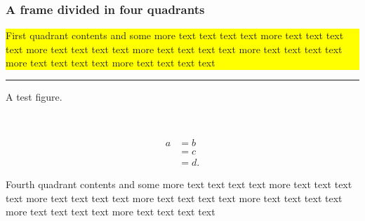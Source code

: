\documentclass[t]{beamer}
\newcommand\FourQuad[4]{
    \colorbox{yellow}{\begin{minipage}[b][.40\textheight][t]{.49\textwidth}#1\end{minipage}}\hfill
    \begin{minipage}[b][.40\textheight][t]{.49\textwidth}#2\end{minipage}\\
    \begin{minipage}[b][.40\textheight][t]{.49\textwidth}#3\end{minipage}\hfill
    \begin{minipage}[b][.40\textheight][t]{.49\textwidth}#4\end{minipage}
}
\begin{document}
\begin{frame}
\frametitle{A frame divided in four quadrants}
\FourQuad%
{First quadrant contents and some more text text text text more text text text text more text text text text more text text text text more text text text text more text text text text more text text text text}%
{
  \centering
  \rule{3cm}{2cm}
  A test figure.
}%
{\begin{align*}
  a &= b \\
  &= c \\
  & = d.
\end{align*}}%
{Fourth quadrant contents and some more text text text text more text text text text more text text text text more text text text text more text text text text more text text text text more text text text text}
\end{frame}
\end{document}
